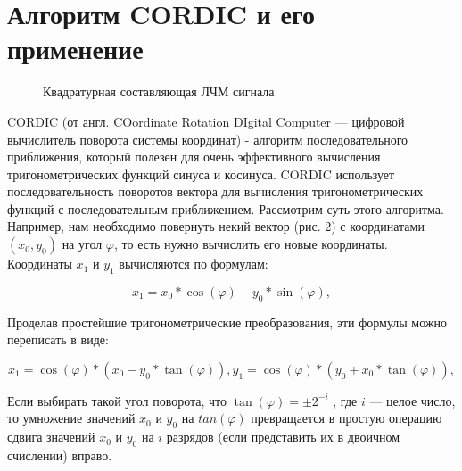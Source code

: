 \documentclass[a4paper,oneside ,14pt]{extreport}
\begin{document}
\section{Алгоритм CORDIC и его применение}

\begin{figure}[h]
    \centering
    \noindent
    \caption{Квадратурная составляющая ЛЧМ сигнала}
    \label{fig:chirp_q}
\end{figure}



CORDIC (от англ. COordinate Rotation DIgital Computer — цифровой вычислитель поворота системы координат) - алгоритм последовательного приближения, который полезен для очень эффективного вычисления тригонометрических функций синуса и косинуса. CORDIC использует последовательность поворотов вектора для вычисления тригонометрических функций с последовательным приближением. Рассмотрим суть этого алгоритма. Например, нам необходимо повернуть некий вектор (рис. 2) с координатами \((x_0, y_0)\) на угол \(\varphi\), то есть нужно вычислить его новые координаты. Координаты \(x_1\) и \(y_1\) вычисляются по формулам:

\begin{displaymath}	
x_{1} = x_0 * \cos(\varphi) - y_{0} * \sin(\varphi),
\end{displaymath}

Проделав простейшие тригонометрические преобразования, эти формулы можно переписать в виде:

\begin{displaymath}	
x_{1} = \cos(\varphi) * (x_{0} - y_{0} * \tan(\varphi)), 
y_{1} = \cos(\varphi) * (y_{0} + x_{0} * \tan(\varphi)),
\end{displaymath}

Если выбирать такой угол поворота, что \(\tan(\varphi) = \pm2^{-i}\) 
, где \(i\) — целое число, то умножение значений 
\(x_0\) и \(y_0\) на \(tan(\varphi)\) превращается в простую операцию сдвига значений \(x_0\) и \(y_0\) на \(i\) разрядов (если представить их
в двоичном счислении) вправо.
\end{document}
